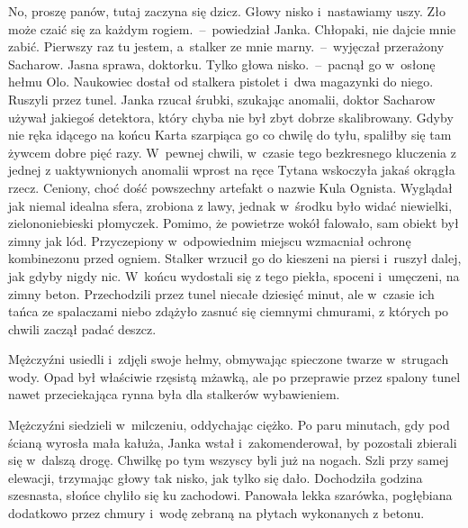 \documentclass[../MAIN.tex]{subfiles}
\begin{document}
\sx No, proszę panów, tutaj zaczyna się dzicz. Głowy nisko i~nastawiamy uszy.
Zło może czaić się za każdym rogiem.~--~powiedział Janka.
\xx Chłopaki, nie dajcie mnie zabić. Pierwszy raz tu jestem, a~stalker ze mnie marny.~--~wyjęczał przerażony Sacharow.
\xx Jasna sprawa, doktorku. Tylko głowa nisko.~--~pacnął go w~osłonę hełmu Olo.
\qd
Naukowiec dostał od stalkera pistolet i~dwa magazynki do niego. Ruszyli przez tunel. Janka rzucał śrubki, szukając anomalii, doktor Sacharow używał jakiegoś detektora, który chyba nie był zbyt dobrze skalibrowany. Gdyby nie ręka idącego na końcu Karta szarpiąca go co chwilę do tyłu, spaliłby się tam żywcem dobre pięć razy. W~pewnej chwili, w~czasie tego bezkresnego kluczenia z jednej z uaktywnionych anomalii wprost na ręce Tytana wskoczyła jakaś okrągła rzecz. Ceniony, choć dość powszechny artefakt o nazwie Kula Ognista. Wyglądał jak niemal idealna sfera, zrobiona z lawy, jednak w~środku było widać niewielki, zielononiebieski płomyczek. Pomimo, że powietrze wokół falowało, sam obiekt był zimny jak lód. Przyczepiony w~odpowiednim miejscu wzmacniał ochronę kombinezonu przed ogniem. Stalker wrzucił go do kieszeni na piersi i~ruszył dalej, jak gdyby nigdy nic. W~końcu wydostali się z tego piekła, spoceni i~umęczeni, na zimny beton. Przechodzili przez tunel niecałe dziesięć minut, ale w~czasie ich tańca ze
spalaczami niebo zdążyło zasnuć się ciemnymi chmurami, z których po chwili zaczął padać deszcz.

Mężczyźni usiedli i~zdjęli swoje hełmy, obmywając spieczone twarze w~strugach wody. Opad był właściwie rzęsistą mżawką, ale po przeprawie przez spalony tunel nawet przeciekająca rynna była dla stalkerów wybawieniem.

Mężczyźni siedzieli w~milczeniu, oddychając ciężko. Po paru minutach, gdy pod ścianą wyrosła mała kałuża, Janka wstał i~zakomenderował, by pozostali zbierali się w~dalszą drogę. Chwilkę po tym wszyscy byli już na nogach. Szli przy samej elewacji, trzymając głowy tak nisko, jak tylko się dało. Dochodziła godzina szesnasta, słońce chyliło się ku zachodowi. Panowała lekka szarówka, pogłębiana dodatkowo przez chmury i~wodę zebraną na płytach wykonanych z betonu.
\end{document}
